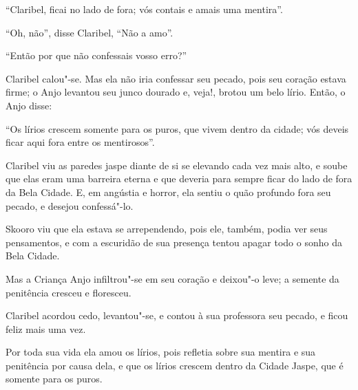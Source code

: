 ``Claribel, ficai no lado de fora; vós contais e amais uma mentira''.

``Oh, não'', disse Claribel, ``Não a amo''.

``Então por que não confessais vosso erro?''

Claribel calou"-se. Mas ela não iria confessar seu pecado, pois seu
coração estava firme; o Anjo levantou seu junco dourado e, veja!, brotou
um belo lírio. Então, o Anjo disse:

``Os lírios crescem somente para os puros, que vivem dentro da cidade;
vós deveis ficar aqui fora entre os mentirosos''.

Claribel viu as paredes jaspe diante de si se elevando cada vez mais
alto, e soube que elas eram uma barreira eterna e que deveria para
sempre ficar do lado de fora da Bela Cidade. E, em angústia e horror,
ela sentiu o quão profundo fora seu pecado, e desejou confessá"-lo.

Skooro viu que ela estava se arrependendo, pois ele, também, podia ver
seus pensamentos, e com a escuridão de sua presença tentou apagar todo o
sonho da Bela Cidade.

Mas a Criança Anjo infiltrou"-se em seu coração e deixou"-o leve; a
semente da penitência cresceu e floresceu.

Claribel acordou cedo, levantou"-se, e contou à sua professora seu
pecado, e ficou feliz mais uma vez.

Por toda sua vida ela amou os lírios, pois refletia sobre sua mentira e
sua penitência por causa dela, e que os lírios crescem dentro da Cidade
Jaspe, que é somente para os puros.


